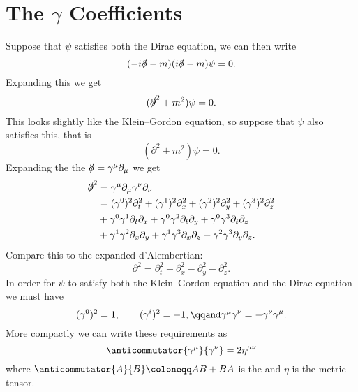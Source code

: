 \documentclass[fleqn]{NotesClass}
\newcommand{\dalembertian}{\partial^2}
\begin{document}
    \section{The \texorpdfstring{\(\gamma\)}{gamma} Coefficients}
    Suppose that \(\psi\) satisfies both the Dirac equation, we can then write
    \begin{equation}
        (-i\slashed{\partial} - m)(i\slashed{\partial} - m)\psi = 0.
    \end{equation}
    Expanding this we get
    \begin{equation}
        (\slashed{\partial}^2 +m^2)\psi = 0.
    \end{equation}
    This looks slightly like the Klein--Gordon equation, so suppose that \(\psi\) also satisfies this, that is
    \begin{equation}
        (\dalembertian + m^2)\psi = 0.
    \end{equation}
    Expanding the the \(\slashed{\partial} = \gamma^\mu \partial_\mu\) we get
    \begin{align}
        \slashed{\partial}^2 &= \gamma^\mu\partial_\mu \gamma^\nu\partial_\nu\\
        &= (\gamma^0)^2\partial_t^2 + (\gamma^1)^2\partial_x^2 + (\gamma^2)^2\partial_y^2 + (\gamma^3)^2\partial_z^2\\
        &+ \gamma^0\gamma^1 \partial_t\partial_x + \gamma^0\gamma^2 \partial_t\partial_y + \gamma^0\gamma^3 \partial_t\partial_z\\
        &+ \gamma^1\gamma^2 \partial_x\partial_y + \gamma^1\gamma^3 \partial_x\partial_z + \gamma^2\gamma^3 \partial_y\partial_z.
    \end{align}
    Compare this to the expanded d'Alembertian:
    \begin{equation}
        \dalembertian = \partial_t^2 - \partial_x^2 - \partial_y^2 - \partial_z^2.
    \end{equation}
    In order for \(\psi\) to satisfy both the Klein--Gordon equation and the Dirac equation we must have
    \begin{equation}
        (\gamma^0)^2 = 1, \qquad (\gamma^i)^2 = -1, \qqand \gamma^\mu \gamma^\nu = -\gamma^\nu \gamma^\mu.
    \end{equation}
    More compactly we can write these requirements as
    \begin{equation}
        \anticommutator{\gamma^\mu}{\gamma^\nu} = 2\eta^{\mu\nu}
    \end{equation}
    where \(\anticommutator{A}{B} \coloneqq AB + BA\) is the  and \(\eta\) is the metric tensor.
    
\end{document}
